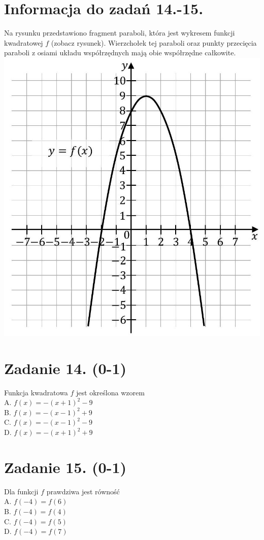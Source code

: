 \documentclass[10pt]{article}
\begin{document}
\section*{Informacja do zadań 14.-15.}
Na rysunku przedstawiono fragment paraboli, która jest wykresem funkcji kwadratowej \(f\) (zobacz rysunek). Wierzchołek tej paraboli oraz punkty przecięcia paraboli z osiami układu współrzędnych mają obie współrzędne całkowite.\\
\includegraphics[max width=\textwidth, center]{2024_11_21_0a35d272448d5080a489g-12}

\section*{Zadanie 14. (0-1)}
Funkcja kwadratowa \(f\) jest określona wzorem\\
A. \(f(x)=-(x+1)^{2}-9\)\\
B. \(f(x)=-(x-1)^{2}+9\)\\
C. \(f(x)=-(x-1)^{2}-9\)\\
D. \(f(x)=-(x+1)^{2}+9\)

\section*{Zadanie 15. (0-1)}
Dla funkcji \(f\) prawdziwa jest równość\\
A. \(f(-4)=f(6)\)\\
B. \(f(-4)=f(4)\)\\
C. \(f(-4)=f(5)\)\\
D. \(f(-4)=f(7)\)
\end{document}
